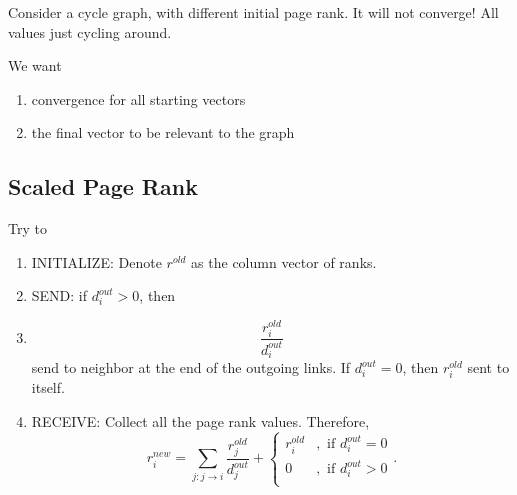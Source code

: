 \begin{eg}
	Consider a cycle graph, with different initial page rank. It will not converge! All values just cycling around.
\end{eg}

We want
\begin{enumerate}
	\item convergence for all starting vectors
	\item the final vector to be relevant to the graph
\end{enumerate}

\subsection{Scaled Page Rank}
\begin{intuition}
	Try to
\end{intuition}
\begin{enumerate}
	\item INITIALIZE: Denote \(r^{old}\) as the column vector of ranks.
	\item SEND: if \(d^{out}_i > 0\), then
	\item \[
		      \frac{r_{i}^{old}}{d_{i}^{out}}
	      \]send to neighbor at the end of the outgoing links. If \(d_{i}^{out} = 0\), then \(r_{i}^{old}\) sent to itself.
	\item RECEIVE: Collect all the page rank values. Therefore,
	      \[
		      r_{i}^{new} = \sum\limits_{j:j\to i}\frac{r_{j}^{old}}{d_{j}^{out}}+\begin{cases}
			      r_{i}^{old} & , \text{ if }d_{i}^{out} = 0 \\
			      0           & , \text{ if }d_{i}^{out} > 0 \\
		      \end{cases} .
	      \]
\end{enumerate}

